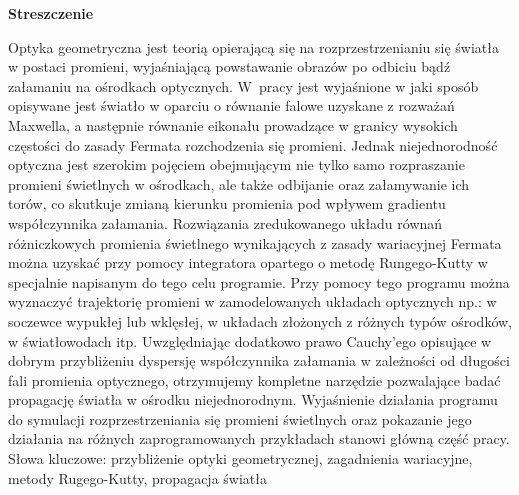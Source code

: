 \documentclass[a4paper,12pkt]{report}
\begin{document}
\baselineskip=15pt




\newpage
\thispagestyle{empty}
\begin{center}
{\bf Streszczenie}
\end{center}
Optyka geometryczna jest teorią opierającą się na rozprzestrzenianiu się światła w postaci promieni, wyjaśniającą powstawanie obrazów po odbiciu bądź załamaniu na ośrodkach optycznych. W~pracy jest wyjaśnione w jaki sposób opisywane jest światło w oparciu o równanie falowe uzyskane z rozważań Maxwella, a następnie równanie eikonału prowadzące w granicy wysokich częstości do zasady Fermata rozchodzenia się promieni. Jednak niejednorodność optyczna jest szerokim pojęciem obejmującym nie tylko samo rozpraszanie promieni świetlnych w ośrodkach, ale także odbijanie oraz załamywanie ich torów, co skutkuje zmianą kierunku promienia pod wpływem gradientu współczynnika załamania.  Rozwiązania zredukowanego układu równań różniczkowych promienia świetlnego wynikających z zasady wariacyjnej Fermata można uzyskać przy pomocy integratora opartego o metodę Rungego-Kutty w specjalnie napisanym do tego celu programie. Przy pomocy tego programu można wyznaczyć trajektorię promieni w zamodelowanych układach optycznych np.: w soczewce wypukłej lub wklęsłej, w układach złożonych z różnych typów ośrodków, w światłowodach itp. Uwzględniając dodatkowo prawo Cauchy’ego opisujące w dobrym przybliżeniu dyspersję współczynnika załamania w zależności od długości fali promienia optycznego, otrzymujemy kompletne narzędzie pozwalające badać propagację światła w ośrodku niejednorodnym. Wyjaśnienie działania programu do symulacji rozprzestrzeniania się promieni świetlnych oraz  pokazanie jego działania na różnych zaprogramowanych przykładach stanowi główną część pracy.\\
Słowa kluczowe: przybliżenie optyki geometrycznej, zagadnienia wariacyjne, metody Rugego-Kutty, propagacja światła
\end{document}
